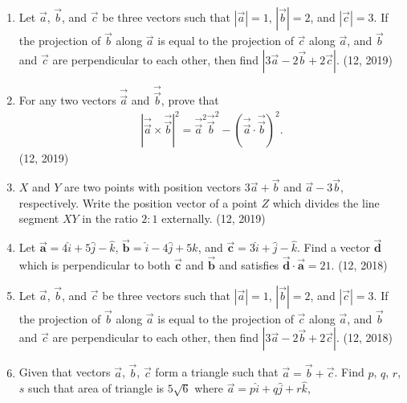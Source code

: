 \begin{enumerate}[label=\thesubsection.\arabic*,ref=\thesubsection.\theenumi]
	\item Let $\overrightarrow{a}$, $\overrightarrow{b}$, and $\overrightarrow{c}$ be three vectors such that $|\overrightarrow{a}| = 1$, $|\overrightarrow{b}| = 2$, and $|\overrightarrow{c}| = 3$. If the projection of $\overrightarrow{b}$ along $\overrightarrow{a}$ is equal to the projection of $\overrightarrow{c}$ along $\overrightarrow{a}$, and $\overrightarrow{b}$ and $\overrightarrow{c}$ are perpendicular to each other, then find $|3\overrightarrow{a} - 2\overrightarrow{b} + 2\overrightarrow{c}|$. \hfill (12, 2019)
	\item For any two vectors $\overrightarrow{\vec{a}}$ and $\overrightarrow{\vec{b}}$, prove that
	\begin{align*}
	|\overrightarrow{\vec{a}} \times \overrightarrow{\vec{b}}|^2 = \overrightarrow{\vec{a}}^2 \overrightarrow{\vec{b}}^2 - (\overrightarrow{\vec{a}} \cdot \overrightarrow{\vec{b}})^2.
	\end{align*} \hfill (12, 2019)
	\item $X$ and $Y$ are two points with position vectors $3\overrightarrow{a} + \overrightarrow{b}$ and $\overrightarrow{a} - 3\overrightarrow{b}$, respectively. Write the position vector of a point $Z$ which divides the line segment $XY$ in the ratio $2:1$ externally. \hfill (12, 2019)
\item Let $\overrightarrow{\mathbf{a}} = 4\hat{i} + 5\hat{j} - \hat{k}$, $\overrightarrow{\mathbf{b}} = \hat{i} - 4\hat{j} + 5\hat{k}$, and $\overrightarrow{\mathbf{c}} = 3\hat{i} + \hat{j} - \hat{k}$. Find a vector $\overrightarrow{\mathbf{d}}$ which is perpendicular to both $\overrightarrow{\mathbf{c}}$ and $\overrightarrow{\mathbf{b}}$ and satisfies $\overrightarrow{\mathbf{d}} \cdot \overrightarrow{\mathbf{a}} = 21$. \hfill (12, 2018)
\item Let $\overrightarrow{a}$, $\overrightarrow{b}$, and $\overrightarrow{c}$ be three vectors such that $|\overrightarrow{a}| = 1$, $|\overrightarrow{b}| = 2$, and $|\overrightarrow{c}| = 3$. If the projection of $\overrightarrow{b}$ along $\overrightarrow{a}$ is equal to the projection of $\overrightarrow{c}$ along $\overrightarrow{a}$, and $\overrightarrow{b}$ and $\overrightarrow{c}$ are perpendicular to each other, then find $|3\overrightarrow{a} - 2\overrightarrow{b} + 2\overrightarrow{c}|$. \hfill (12, 2018)
\item Given that vectors $\overrightarrow{a}$, $\overrightarrow{b}$, $\overrightarrow{c}$ form a triangle such that
      $\overrightarrow{a} = \overrightarrow{b}+\overrightarrow{c}$. Find $p$, $q$, $r$, $s$ such that area of triangle is $5\sqrt{6}$ where $\overrightarrow{a} = p\hat{i} +q\hat{j}+r\hat{k}$,

\end{enumerate}
